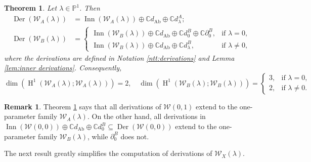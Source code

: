 \documentclass[11pt, svgnames]{amsart}
\newcommand{\CC}{\mathbb{C}}
\newcommand{\PP}{\mathbb{P}}
\newcommand{\W}{\mathcal{W}}
\DeclareMathOperator{\Der}{Der}
\DeclareMathOperator{\Inn}{Inn}
\newcommand{\del}{\partial}
\DeclareMathOperator{\HH}{H}
\DeclareMathOperator{\Ab}{Ab}
\newtheorem{theorem}[proposition]{Theorem}
\theoremstyle{definition}
\newtheorem{remark}[proposition]{Remark}
\begin{document}
\begin{theorem}\label{thm:derivations}
    Let $\lambda \in \PP^1$. Then
    \begin{align*}
        \Der(\W_A(\lambda)) &= \Inn(\W_A(\lambda)) \oplus \CC d_{\Ab} \oplus \CC d_\lambda^A; \\
        \Der(\W_B(\lambda)) &= \begin{cases}
            \Inn(\W_B(\lambda)) \oplus \CC d_{\Ab} \oplus \CC d_0^B \oplus \CC \del_0^B, &\text{if } \lambda = 0, \\
            \Inn(\W_B(\lambda)) \oplus \CC d_{\Ab} \oplus \CC d_\lambda^B, &\text{if } \lambda \neq 0,
        \end{cases}
    \end{align*}
    where the derivations are defined in Notation \ref{ntt:derivations} and Lemma \ref{lem:inner derivations}. Consequently,
    $$\dim(\HH^1(\W_A(\lambda);\W_A(\lambda))) = 2, \quad \dim(\HH^1(\W_B(\lambda);\W_B(\lambda))) = \begin{cases}
        3, &\text{if } \lambda = 0, \\
        2, &\text{if } \lambda \neq 0.
    \end{cases}$$
\end{theorem}

\begin{remark}
    Theorem \ref{thm:derivations} says that all derivations of $\W(0,1)$ extend to the one-parameter family $\W_A(\lambda)$. On the other hand, all derivations in $\Inn(\W(0,0)) \oplus \CC d_{\Ab} \oplus \CC d_0^B \subseteq \Der(\W(0,0))$ extend to the one-parameter family $\W_B(\lambda)$, while $\del_0^B$ does not.
\end{remark}

The next result greatly simplifies the computation of derivations of $\W_X(\lambda)$.
\end{document}
